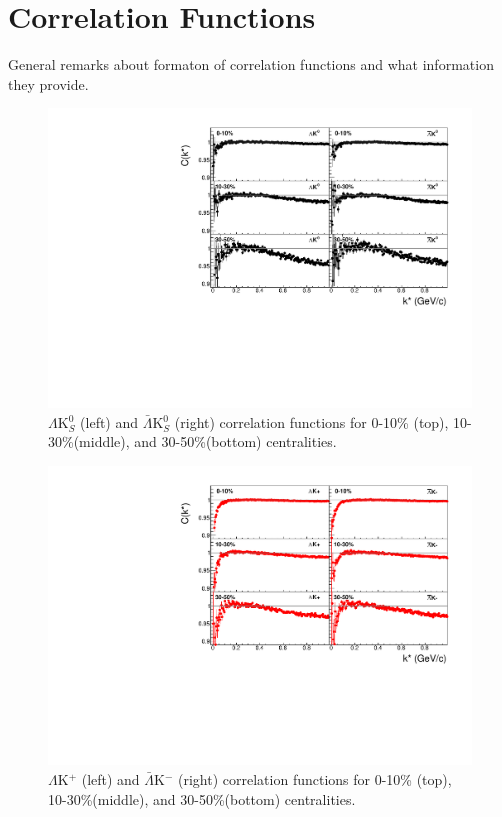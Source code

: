 \documentclass[../AnalysisNoteJBuxton.tex]{subfiles}
\begin{document}
\section{Correlation Functions}
\label{CorrelationFunctions}

General remarks about formaton of correlation functions and what information they provide.

\begin{figure}[h]
  \centering
  \includegraphics[width=\textwidth]{4_CorrelationFunctions/Figures/canKStarCfsLamK0wConj.pdf}
  \caption[$\Lambda$($\bar{\Lambda}$)K$^{0}_{S}$ Correlation Functions]{$\Lambda$K$^{0}_{S}$ (left) and $\bar{\Lambda}$K$^{0}_{S}$ (right) correlation functions for 0-10\% (top), 10-30\%(middle), and 30-50\%(bottom) centralities.}
  \label{fig:cLamK0Cfs}
\end{figure}

\begin{figure}[h]
  \centering
  \includegraphics[width=\textwidth]{4_CorrelationFunctions/Figures/canKStarCfsLamKchPwConj.pdf}
  \caption[$\Lambda$K$^{+}$ and $\bar{\Lambda}$K$^{-}$ Correlation Functions]{$\Lambda$K$^{+}$ (left) and $\bar{\Lambda}$K$^{-}$ (right) correlation functions for 0-10\% (top), 10-30\%(middle), and 30-50\%(bottom) centralities.}
  \label{fig:LamKchPwConjCfs}
\end{figure}
\end{document}
